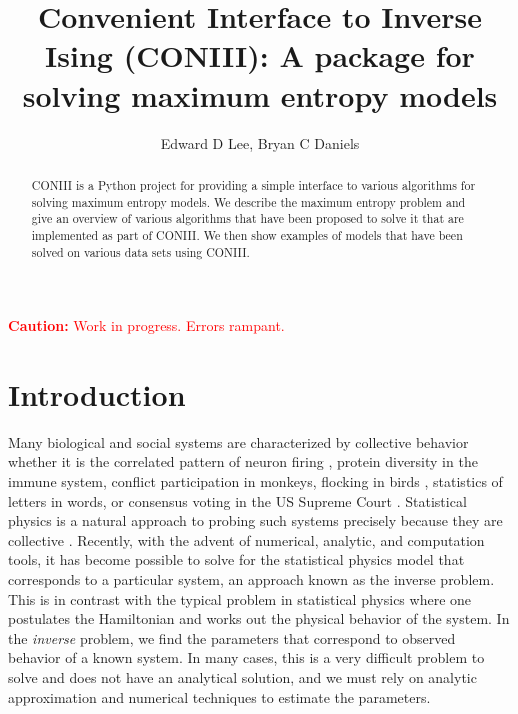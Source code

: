 \documentclass[aps,prl,twocolumn]{revtex4-1}
\begin{document}
\newcommand{\mr}[1]{\mathrm{#1}}
\newcommand{\mb}[1]{\mathbf{#1}}
\newcommand{\br}[1]{\left<#1\right>}
\newcommand{\bl}[1]{\left|#1\right|}
\newcommand{\mc}[1]{\mathcal{#1}}
\newcommand{\tb}[1]{\textcolor{blue}{#1}}
\newcommand{\tr}[1]{\textcolor{red}{#1}}
\newcommand{\tg}[1]{\textcolor{green}{#1}}
\newcommand{\si}[0]{\sigma_{\rm i}}
\newcommand{\sj}[0]{\sigma_{\rm j}}

\title{Convenient Interface to Inverse Ising (CONIII): A package for solving maximum entropy models}
\author{Edward D Lee, Bryan C Daniels}

\begin{abstract}
CONIII is a Python project for providing a simple interface to various algorithms for solving maximum entropy models. We describe the maximum entropy problem and give an overview of various algorithms that have been proposed to solve it that are implemented as part of CONIII. We then show examples of models that have been solved on various data sets using CONIII.
\end{abstract}

\maketitle

\tr{{\bf Caution:} Work in progress. Errors rampant.}

\section{Introduction}
Many biological and social systems are characterized by collective behavior whether it is the correlated pattern of neuron firing \cite{Schneidman:2006he}, protein diversity in the immune system, conflict participation in monkeys, flocking in birds \cite{Bialek:2012cs}, statistics of letters in words, or consensus voting in the US Supreme Court \cite{Lee:2015ev}. Statistical physics is a natural approach to probing such systems precisely because they are collective \cite{Castellano:2009ce}.
Recently, with the advent of numerical, analytic, and computation tools, it has become possible to solve for the statistical physics model that corresponds to a particular system, an approach known as the inverse problem.
This is in contrast with the typical problem in statistical physics where one postulates the Hamiltonian and works out the physical behavior of the system. In the \textit{inverse} problem, we  find the parameters that correspond to observed behavior of a known system. In many cases, this is a very difficult problem to solve and does not have an analytical solution, and we must rely on analytic approximation and numerical techniques to estimate the parameters.
\end{document}
